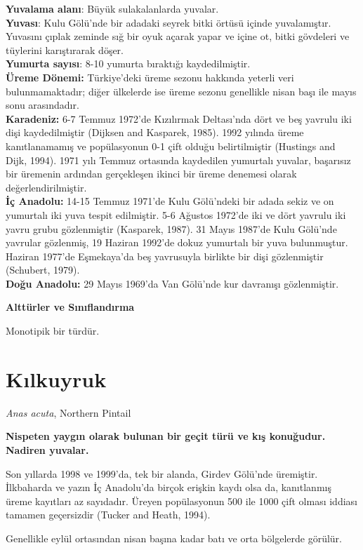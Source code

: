 \documentclass[
  a4paper,
  DIV=11,
  numbers=noendperiod]{scrartcl}
\begin{document}
\textbf{Yuvalama alanı}: Büyük sulakalanlarda yuvalar.\\
\textbf{Yuvası}: Kulu Gölü'nde bir adadaki seyrek bitki örtüsü içinde
yuvalamıştır. Yuvasını çıplak zeminde sığ bir oyuk açarak yapar ve içine
ot, bitki gövdeleri ve tüylerini karıştırarak döşer.\\
\textbf{Yumurta sayısı}: 8-10 yumurta bıraktığı kaydedilmiştir.\\
\textbf{Üreme Dönemi:} Türkiye'deki üreme sezonu hakkında yeterli veri
bulunmamaktadır; diğer ülkelerde ise üreme sezonu genellikle nisan başı
ile mayıs sonu arasındadır.\\
\textbf{Karadeniz:} 6-7 Temmuz 1972'de Kızılırmak Deltası'nda dört ve
beş yavrulu iki dişi kaydedilmiştir (Dijksen and Kasparek, 1985). 1992
yılında üreme kanıtlanamamış ve popülasyonun 0-1 çift olduğu
belirtilmiştir (Hustings and Dijk, 1994). 1971 yılı Temmuz ortasında
kaydedilen yumurtalı yuvalar, başarısız bir üremenin ardından
gerçekleşen ikinci bir üreme denemesi olarak değerlendirilmiştir.\\
\textbf{İç Anadolu:} 14-15 Temmuz 1971'de Kulu Gölü'ndeki bir adada
sekiz ve on yumurtalı iki yuva tespit edilmiştir. 5-6 Ağustos 1972'de
iki ve dört yavrulu iki yavru grubu gözlenmiştir (Kasparek, 1987). 31
Mayıs 1987'de Kulu Gölü'nde yavrular gözlenmiş, 19 Haziran 1992'de dokuz
yumurtalı bir yuva bulunmuştur. Haziran 1977'de Eşmekaya'da beş
yavrusuyla birlikte bir dişi gözlenmiştir (Schubert, 1979).\\
\textbf{Doğu Anadolu:} 29 Mayıs 1969'da Van Gölü'nde kur davranışı
gözlenmiştir.

\textbf{Alttürler ve Sınıflandırma}

Monotipik bir türdür.

\section{Kılkuyruk}\label{kux131lkuyruk}

\emph{Anas acuta}, Northern Pintail

\textbf{Nispeten yaygın olarak bulunan bir geçit türü ve kış konuğudur.
Nadiren yuvalar.}

Son yıllarda 1998 ve 1999'da, tek bir alanda, Girdev Gölü'nde üremiştir.
İlkbaharda ve yazın İç Anadolu'da birçok erişkin kaydı olsa da,
kanıtlanmış üreme kayıtları az sayıdadır. Üreyen popülasyonun 500 ile
1000 çift olması iddiası tamamen geçersizdir (Tucker and Heath, 1994).

Genellikle eylül ortasından nisan başına kadar batı ve orta bölgelerde
görülür.
\end{document}
